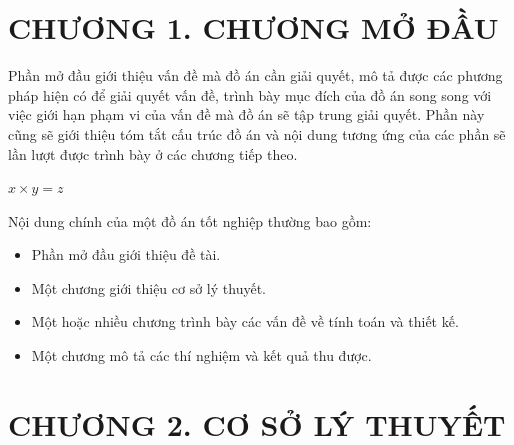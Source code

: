 \documentclass{article} %
\begin{document}




\tableofcontents 
\thispagestyle{empty}
\cleardoublepage


{\let\oldnumberline\numberline
\renewcommand{\numberline}{Hình~\oldnumberline}
\listoffigures} 
\newpage

{\let\oldnumberline\numberline
\renewcommand{\numberline}{Bảng~\oldnumberline}
\listoftables}
\newpage


\section*{CHƯƠNG 1.  CHƯƠNG MỞ ĐẦU}
Phần mở đầu giới thiệu vấn đề mà đồ án cần giải quyết, mô tả được các phương pháp hiện có để giải quyết vấn đề, trình bày mục đích của đồ án song song với việc giới hạn phạm vi của vấn đề mà đồ án sẽ tập trung giải quyết. Phần này cũng sẽ giới thiệu tóm tắt cấu trúc đồ án và nội dung tương ứng của các phần sẽ lần lượt được trình bày ở các chương tiếp theo.

$x \times y = z$

Nội dung chính của một đồ án tốt nghiệp thường bao gồm:
\begin{itemize}
    \item Phần mở đầu giới thiệu đề tài.
    \item Một chương giới thiệu cơ sở lý thuyết.
    \item Một hoặc nhiều chương trình bày các vấn đề về tính toán và thiết kế.
    \item Một chương mô tả các thí nghiệm và kết quả thu được.
\end{itemize}
\newpage

\section*{CHƯƠNG 2.  CƠ SỞ LÝ THUYẾT}
\setcounter{section}{2}
\setcounter{figure}{0}
\setcounter{table}{0}
\end{document}

